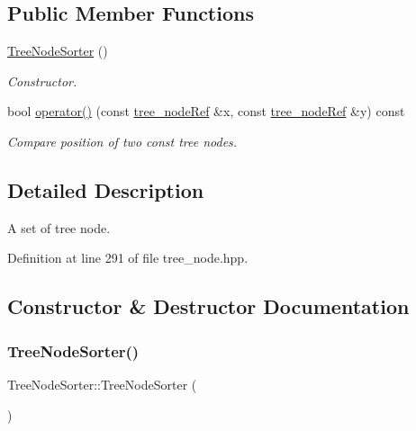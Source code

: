 \subsection*{Public Member Functions}
\begin{DoxyCompactItemize}
\item 
\hyperlink{classTreeNodeSorter_a98fb85a9c57c196f91626b395cb63748}{Tree\+Node\+Sorter} ()
\begin{DoxyCompactList}\small\item\em Constructor. \end{DoxyCompactList}\item 
bool \hyperlink{classTreeNodeSorter_acf8467e107543d4a8a108e15bc8aec33}{operator()} (const \hyperlink{tree__node_8hpp_a6ee377554d1c4871ad66a337eaa67fd5}{tree\+\_\+node\+Ref} \&x, const \hyperlink{tree__node_8hpp_a6ee377554d1c4871ad66a337eaa67fd5}{tree\+\_\+node\+Ref} \&y) const
\begin{DoxyCompactList}\small\item\em Compare position of two const tree nodes. \end{DoxyCompactList}\end{DoxyCompactItemize}


\subsection{Detailed Description}
A set of tree node. 

Definition at line 291 of file tree\+\_\+node.\+hpp.



\subsection{Constructor \& Destructor Documentation}
\mbox{\label{classTreeNodeSorter_a98fb85a9c57c196f91626b395cb63748}} 
\subsubsection{\texorpdfstring{Tree\+Node\+Sorter()}{TreeNodeSorter()}}
{\footnotesize\ttfamily Tree\+Node\+Sorter\+::\+Tree\+Node\+Sorter (\begin{DoxyParamCaption}{ }\end{DoxyParamCaption})}



